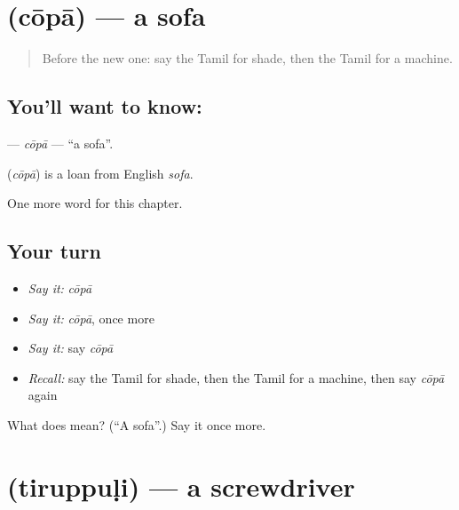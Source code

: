 \section[\texorpdfstring{\ta{சோபா} (cōpā)}{சோபா (cōpā)}]{ (cōpā) — a sofa}

\label{lesson:TA-C276-copa}



\begin{quote}
Before the new one: say the Tamil for shade, then the Tamil for a machine.
\end{quote}

\subsection*{You'll want to know: }
\textbf{} — \emph{cōpā} — \textquotedblleft{}a sofa\textquotedblright{}.

\begin{cousinweb}
\textbf{} (\emph{cōpā}) is a loan from English \emph{sofa}.
\end{cousinweb}

\begin{grammarlens}[title={What you've built}]
One more word for this chapter.
\end{grammarlens}

\subsection*{Your turn}
\begin{itemize}
\raggedright
  \item \emph{Say it:} \emph{cōpā}
  \item \emph{Say it:} \emph{cōpā}, once more
  \item \emph{Say it:} say \emph{cōpā}
  \item \emph{Recall:} say the Tamil for shade, then the Tamil for a machine, then say \emph{cōpā} again
\end{itemize}

\begin{tcolorbox}[breakable,colback=teal!4,colframe=teal!35!black,title={Before you move on}]
What does  mean? (\textquotedblleft{}A sofa\textquotedblright{}.) Say it once more.
\end{tcolorbox}
\section[\texorpdfstring{\ta{திருப்புளி} (tiruppuḷi)}{திருப்புளி (tiruppuḷi)}]{ (tiruppuḷi) — a screwdriver}

